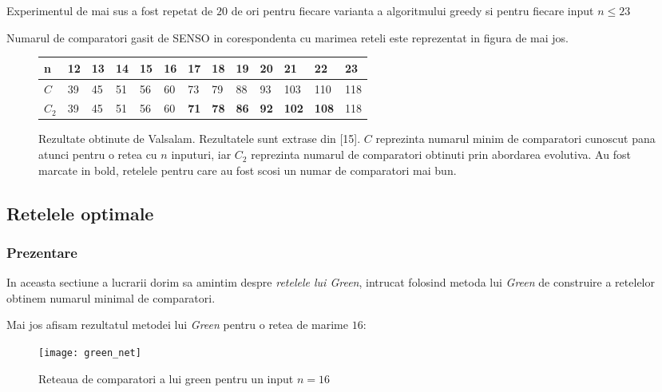 \documentclass[12pt]{article}
\begin{document}
Experimentul de mai sus a fost repetat de $20$ de ori pentru fiecare varianta a algoritmului greedy si pentru fiecare input $n \leq 23$

Numarul de comparatori gasit de SENSO in corespondenta cu marimea reteli este reprezentat in figura de mai jos.

\begin{figure}
\centering
\begin{tabu} to 1.19	 \textwidth {  X[0] | X[1]  |  X[2]  |  X[3] | X[4] | X[5] | X[6] | X[7] | X[8] | X[9] | X[10] | X[11] | X[12] }
 \hline
 n & 12 & 13 & 14 & 15 & 16 & 17 & 18 & 19 & 20 & 21 & 22 & 23\\
 \hline
 $C$  & 39 & 45 & 51 & 56 & 60 & 73 & 79 & 88 & 93 & 103 & 110 & 118\\
 \hline
 $C_2$ & 39 & 45 & 51 & 56 & 60 & \textbf{71} & \textbf{78} & \textbf{86} & \textbf{92} & \textbf{102} & \textbf{108} & 118 \\
 
\hline
\end{tabu}
\caption{Rezultate obtinute de Valsalam. Rezultatele sunt extrase din [15]. $C$ reprezinta numarul minim de comparatori cunoscut pana atunci pentru o retea cu $n$ inputuri, iar $C_2$ reprezinta numarul de comparatori obtinuti prin abordarea evolutiva. Au fost marcate in bold, retelele pentru care au fost scosi un numar de comparatori mai bun.}
\end{figure}


\subsection{Retelele optimale}

\subsubsection{Prezentare}
In aceasta sectiune a lucrarii dorim sa amintim despre \textit{retelele lui Green}, intrucat folosind metoda lui \textit{Green} de construire a retelelor obtinem numarul minimal de comparatori.

Mai jos afisam rezultatul metodei lui \textit{Green} pentru o retea de marime $16$:

\begin{figure}
\centering
\texttt{[image: green\_net]}
\\
\caption{Reteaua de comparatori a lui green pentru un input $n = 16$}
\end{figure}
\end{document}
